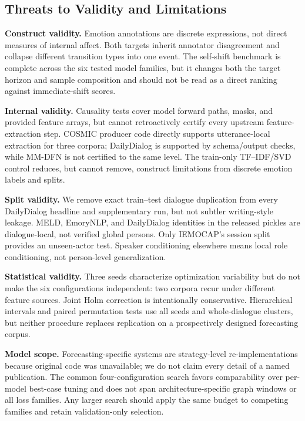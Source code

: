 \documentclass{ieeeaccess}
\begin{document}
\subsection{Threats to Validity and Limitations}

\textbf{Construct validity.} Emotion annotations are discrete expressions, not direct measures of
internal affect. Both targets inherit annotator disagreement and collapse different transition
types into one event. The self-shift benchmark is complete across the six tested model families,
but it changes both the target horizon and sample composition and should not be read as a direct
ranking against immediate-shift scores.

\textbf{Internal validity.} Causality tests cover model forward paths, masks, and provided feature
arrays, but cannot retroactively certify every upstream feature-extraction step. COSMIC producer
code directly supports utterance-local extraction for three corpora; DailyDialog is supported by
schema/output checks, while MM-DFN is not certified to the same level. The train-only TF--IDF/SVD
control reduces, but cannot remove, construct limitations from discrete emotion labels and splits.

\textbf{Split validity.} We remove exact train--test dialogue duplication from every DailyDialog
headline and supplementary run, but not subtler writing-style leakage. MELD, EmoryNLP, and DailyDialog identities
in the released pickles are dialogue-local, not verified global persons. Only IEMOCAP's session
split provides an unseen-actor test. Speaker conditioning elsewhere means local role conditioning,
not person-level generalization.

\textbf{Statistical validity.} Three seeds characterize optimization variability but do not make
the six configurations independent: two corpora recur under different feature sources. Joint Holm
correction is intentionally conservative. Hierarchical intervals and paired permutation tests use
all seeds and whole-dialogue clusters, but neither procedure replaces replication on a
prospectively designed forecasting corpus.

\textbf{Model scope.} Forecasting-specific systems are strategy-level re-implementations because
original code was unavailable; we do not claim every detail of a named publication. The common
four-configuration search favors comparability over per-model best-case tuning and does not span
architecture-specific graph windows or all loss families. Any larger search should apply the same
budget to competing families and retain validation-only selection.
\end{document}
